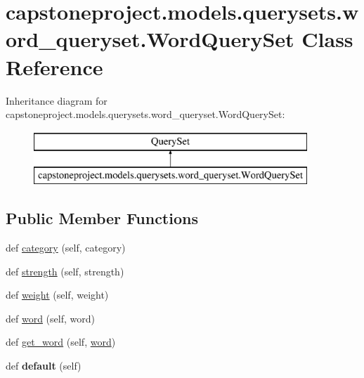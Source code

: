 \hypertarget{classcapstoneproject_1_1models_1_1querysets_1_1word__queryset_1_1_word_query_set}{}\section{capstoneproject.\+models.\+querysets.\+word\+\_\+queryset.\+Word\+Query\+Set Class Reference}
\label{classcapstoneproject_1_1models_1_1querysets_1_1word__queryset_1_1_word_query_set}
Inheritance diagram for capstoneproject.\+models.\+querysets.\+word\+\_\+queryset.\+Word\+Query\+Set\+:\begin{figure}[H]
\begin{center}
\leavevmode
\includegraphics[height=2.000000cm]{classcapstoneproject_1_1models_1_1querysets_1_1word__queryset_1_1_word_query_set}
\end{center}
\end{figure}
\subsection*{Public Member Functions}
\begin{DoxyCompactItemize}
\item 
def \mbox{\hyperlink{classcapstoneproject_1_1models_1_1querysets_1_1word__queryset_1_1_word_query_set_a2ef3ee38bf66a89886b7e20144758321}{category}} (self, category)
\item 
def \mbox{\hyperlink{classcapstoneproject_1_1models_1_1querysets_1_1word__queryset_1_1_word_query_set_ae89fbd6a602e811d2a19cf15d50d48fc}{strength}} (self, strength)
\item 
def \mbox{\hyperlink{classcapstoneproject_1_1models_1_1querysets_1_1word__queryset_1_1_word_query_set_a607efd6f48c5fbf86b8c68166049ccd3}{weight}} (self, weight)
\item 
def \mbox{\hyperlink{classcapstoneproject_1_1models_1_1querysets_1_1word__queryset_1_1_word_query_set_a65420de07adbc0ce15fb220b307c2dbc}{word}} (self, word)
\item 
def \mbox{\hyperlink{classcapstoneproject_1_1models_1_1querysets_1_1word__queryset_1_1_word_query_set_a6dde385852aa9989aa6bf42764bd3c28}{get\+\_\+word}} (self, \mbox{\hyperlink{classcapstoneproject_1_1models_1_1querysets_1_1word__queryset_1_1_word_query_set_a65420de07adbc0ce15fb220b307c2dbc}{word}})
\item 
\mbox{\label{classcapstoneproject_1_1models_1_1querysets_1_1word__queryset_1_1_word_query_set_affc494926d0ebcecace5e728e7a39a38}} 
def {\bfseries default} (self)
\end{DoxyCompactItemize}
